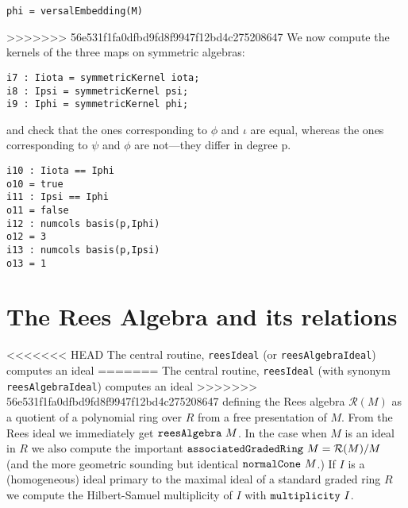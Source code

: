 \documentclass[twoside,12pt, leqno]{amsart}
\def\RR{{\mathcal R}}
\begin{document}
\begin{verbatim}
phi = versalEmbedding(M)
\end{verbatim}
\begin{normalsize}
>>>>>>> 56e531f1fa0dfbd9fd8f9947f12bd4c275208647
     We now compute the kernels of the three maps
     on symmetric algebras:
\begin{footnotesize}
 \begin{verbatim}
i7 : Iiota = symmetricKernel iota;
i8 : Ipsi = symmetricKernel psi;
i9 : Iphi = symmetricKernel phi;
\end{verbatim}
\end{footnotesize}
      and check that the ones corresponding to $\phi$ and $\iota$
     are equal, whereas the ones corresponding to $\psi$ and $\phi$
     are not---they differ in degree p.
\begin{footnotesize} \begin{verbatim}
i10 : Iiota == Iphi    
o10 = true
i11 : Ipsi == Iphi
o11 = false
i12 : numcols basis(p,Iphi) 
o12 = 3
i13 : numcols basis(p,Ipsi)
o13 = 1
\end{verbatim}
\end{footnotesize}


\section{The Rees Algebra and its relations}

<<<<<<< HEAD
The central routine, {\tt reesIdeal} (or {\tt reesAlgebraIdeal}) computes an ideal
=======
The central routine, {\tt reesIdeal} (with synonym {\tt reesAlgebraIdeal}) computes an ideal
>>>>>>> 56e531f1fa0dfbd9fd8f9947f12bd4c275208647
defining the Rees algebra $\RR(M)$ as a quotient of a polynomial ring over $R$ from a free presentation of $M$. From the Rees ideal we immediately get
${\tt reesAlgebra}\ M$. In the case when $M$ is an ideal in $R$ we also compute
the important ${\tt associatedGradedRing\ }M = \RR(M)/M$ (and the more geometric sounding but identical ${\tt normalCone\ }M$.)  
If $I$ is a (homogeneous) ideal primary to the
maximal ideal of a standard graded ring $R$ we compute the
Hilbert-Samuel multiplicity of $I$ with ${\tt multiplicity\ }I$.


\end{normalsize}
\end{document}
